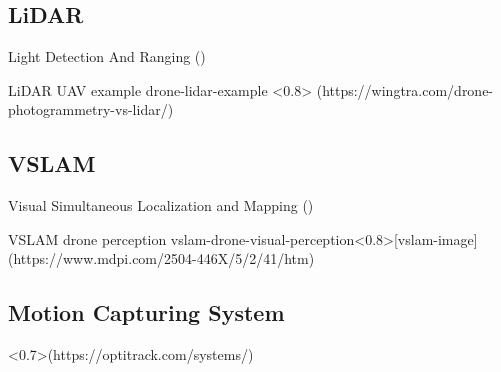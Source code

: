 \subsection{LiDAR}
Light Detection And Ranging ()
 
{LiDAR UAV example}%
{drone-lidar-example}%
<0.8>%
(https://wingtra.com/drone-photogrammetry-vs-lidar/)


\subsection{VSLAM}
Visual Simultaneous Localization and Mapping ()

\cite{vslam-for-drone-localization}

{VSLAM drone perception}
{vslam-drone-visual-perception}<0.8>[vslam-image](https://www.mdpi.com/2504-446X/5/2/41/htm)

\subsection{Motion Capturing System}
<0.7>(https://optitrack.com/systems/)




